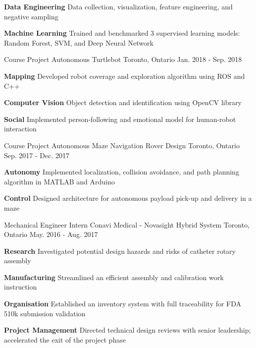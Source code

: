 \begin{cventries}
{\begin{cvitems}
			\item {\textbf{Data Engineering} Data collection, visualization, feature engineering, and negative sampling}
			\item {\textbf{Machine Learning} Trained and benchmarked 3 supervised learning models: Random Forest, SVM, and Deep Neural Network}
		\end{cvitems}
	}
	\cventry
	{Course Project}
	{Autonomous Turtlebot}
	{Toronto, Ontario}
	{Jan. 2018 - Sep. 2018}
	{
		\begin{cvitems}
			\item {\textbf{Mapping} Developed robot coverage and exploration algorithm using ROS and C++}
			\item {\textbf{Computer Vision} Object detection and identification using OpenCV library}
			\item {\textbf{Social} Implemented person-following and emotional model for human-robot interaction}
		\end{cvitems}
	}
	\cventry
	{Course Project}
	{Autonomous Maze Navigation Rover Design}
	{Toronto, Ontario}
	{Sep. 2017 - Dec. 2017}
	{
		\begin{cvitems}
			\item { \textbf{Autonomy} Implemented localization, collision avoidance, and path planning algorithm in MATLAB and Arduino}
			\item { \textbf{Control} Designed architecture for autonomous payload pick-up and delivery in a maze}
		\end{cvitems}
	}
	\cventry
	{Mechanical Engineer Intern}
	{Conavi Medical - Novasight Hybrid System} 
	{Toronto, Ontario}
	{May. 2016 - Aug. 2017}
	{
		\begin{cvitems}
			\item {
				\textbf{Research} Investigated potential design hazards and risks of catheter rotary assembly
			}
			\item {
				\textbf{Manufacturing} Streamlined an efficient assembly and calibration work instruction}
			\item {
				\textbf{Organisation} Established an inventory system with full traceability for FDA 510k submission validation}
			\item {
				\textbf{Project Management} Directed technical design reviews with senior leadership; accelerated the exit of the project phase}
		\end{cvitems}
	}  
\end{cventries}
